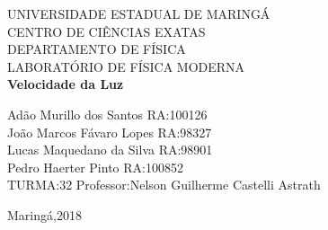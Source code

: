 \documentclass[a4paper,10pt]{article}
\begin{document}
	

\begin{titlepage}
\begin{center}
{\large UNIVERSIDADE ESTADUAL DE MARINGÁ}\\[0.2cm]
{\large CENTRO DE CIÊNCIAS EXATAS}\\[0.2cm]
{\large DEPARTAMENTO DE FÍSICA}\\[0.2cm]
{\large LABORATÓRIO DE FÍSICA MODERNA}\\[7.0cm]
{\bf \huge Velocidade da Luz}\\[7.0cm]
\end{center}
{\large Adão Murillo dos Santos \hfill RA:100126}\\[0.7cm]
{\large João Marcos Fávaro Lopes \hfill RA:98327}\\[0.7cm]
{\large Lucas Maquedano da Silva \hfill RA:98901}\\[0.7cm]
{\large Pedro Haerter Pinto \hfill RA:100852}\\[0.7cm]
{\large TURMA:32 \hfill Professor:Nelson Guilherme Castelli
Astrath}\\[1.0cm]
\begin{center}
{\large Maringá,2018}\\[0.2cm]
\end{center}
\end{titlepage}




\end{document}
